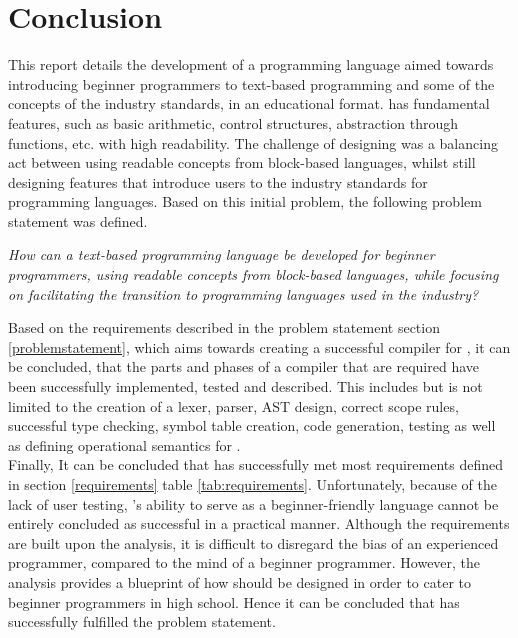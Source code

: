 \chapter{Conclusion}



This report details the development of \lang a programming language aimed towards introducing beginner programmers to text-based programming and some of the concepts of the industry standards, in an educational format. \lang has fundamental features, such as basic arithmetic, control structures, abstraction through functions, etc. with high readability. The challenge of designing \lang was a balancing act between using readable concepts from block-based languages, whilst still designing features that introduce users to the industry standards for programming languages. Based on this initial problem, the following problem statement was defined. 

\begin{center}
    \textit{How can a text-based programming language be developed for beginner programmers, using readable concepts from block-based languages, while focusing on facilitating the transition to programming languages used in the industry?}
\end{center} 

Based on the requirements described in the problem statement section \ref{problemstatement}, which aims towards creating a successful compiler for \lang, it can be concluded, that the parts and phases of a compiler that are required have been successfully implemented, tested and described. This includes but is not limited to the creation of a lexer, parser, AST design, correct scope rules, successful type checking, symbol table creation, code generation, testing as well as defining operational semantics for \lang. \\

Finally, It can be concluded that \lang has successfully met most requirements defined in section \ref{requirements} table \ref{tab:requirements}. Unfortunately, because of the lack of user testing, \lang's ability to serve as a beginner-friendly language cannot be entirely concluded as successful in a practical manner. Although the requirements are built upon the analysis, it is difficult to disregard the bias of an experienced programmer, compared to the mind of a beginner programmer. However, the analysis provides a blueprint of how \lang should be designed in order to cater to beginner programmers in high school. Hence it can be concluded that \lang has successfully fulfilled the problem statement.\\


